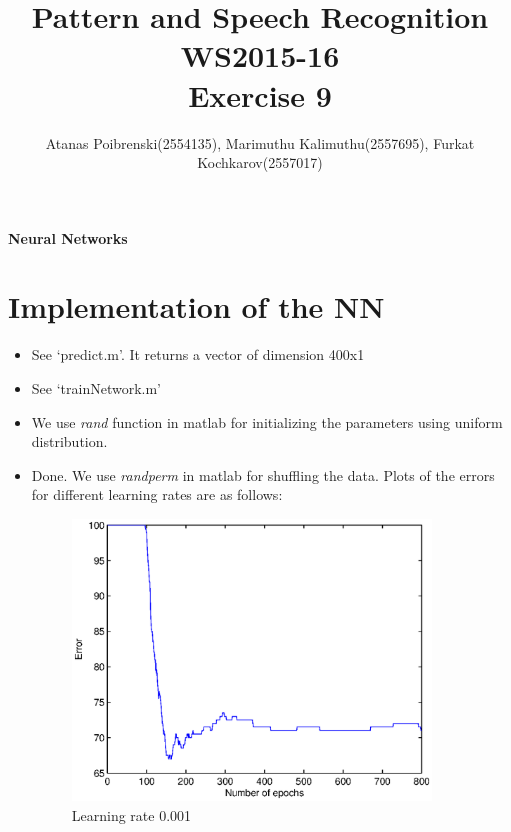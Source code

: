 \documentclass[a4paper]{article}
\title{Pattern and Speech Recognition WS2015-16 \\ Exercise 9}
\author{Atanas Poibrenski(2554135), Marimuthu Kalimuthu(2557695), Furkat Kochkarov(2557017)}
\begin{document}

\maketitle 
\begin{center}
	\textbf{Neural Networks}
\end{center}

\section*{Implementation of the NN}
\begin{itemize}
	\item See `predict.m'. It returns a vector of dimension 400x1
	\item See `trainNetwork.m'
	\item We use \textit{rand} function in matlab for initializing the parameters using uniform distribution.
	\item Done. We use \textit{randperm} in matlab for shuffling the data. 
	Plots of the errors for different learning rates are as follows:

	\begin{tcolorbox}
	\begin{figure}[H]
		\begin{center}
			\includegraphics[width=0.9\textwidth]{learningrate0001.eps}
			\caption{ Learning rate 0.001}\label{fig:learn0.001}
		\end{center}
	\end{figure}
	\end{tcolorbox}
	

\end{itemize}
\end{document}
